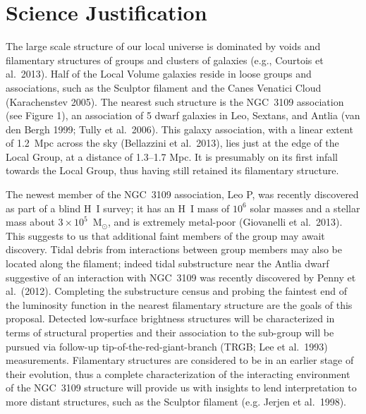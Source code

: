 \documentclass[12pt]{article}
\begin{document}
\section*{Science Justification}

The large scale structure of our local universe is dominated by voids and filamentary structures of groups and clusters of galaxies 
(e.g., Courtois et al.\ 2013).  Half of the Local Volume galaxies reside in loose groups and associations, such as the Sculptor filament and the Canes Venatici Cloud (Karachenstev 2005). The nearest such structure is the NGC~3109 association (see Figure 1), an association of 5 dwarf galaxies in Leo, Sextans, and Antlia (van den Bergh 1999; Tully et al.\ 2006). This galaxy association, with a linear extent of 1.2~Mpc across the sky (Bellazzini et al.\ 2013), lies just at the edge of the Local Group, at a distance of 1.3--1.7 Mpc. It is  presumably on its first infall towards the Local Group, thus having still retained its filamentary structure. 


The newest member of the NGC~3109 association, Leo P, was recently discovered as part of a blind H~I survey;
it has an H~I mass of $10^6$ solar masses and a stellar mass about $3\times10^5$~M$_{\odot}$, and is extremely metal-poor (Giovanelli et al.\ 2013).
This suggests to us that additional  faint members of the group may await discovery. Tidal debris from interactions between group members may also be located along the filament; indeed tidal substructure near the Antlia dwarf suggestive of an interaction with NGC~3109 was recently discovered by Penny et al.\ (2012). Completing the substructure census and probing the faintest end of the luminosity function in the nearest filamentary structure are the goals of this proposal. Detected low-surface brightness structures will be characterized in terms of structural properties and their association to the sub-group will be pursued via follow-up tip-of-the-red-giant-branch (TRGB; Lee et al.\ 1993) measurements. Filamentary structures are considered to be in an earlier stage of their evolution, thus a complete characterization of the interacting environment of the NGC~3109 structure will provide us with insights to lend interpretation to more distant structures, such as the Sculptor filament (e.g. Jerjen et al.\ 1998).
\end{document}
